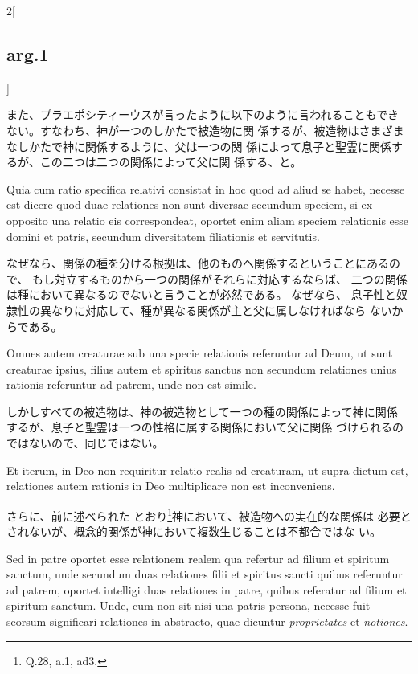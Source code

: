 \documentclass[paper=a4paper,fontsize=10pt,jafontsize=9pt,titlepage]{jlreq}
\begin{document}
\begin{paracol}{2}[\subsection{arg.1}]
\switchcolumn

また、プラエポシティーウスが言ったように以下のように言われることもでき
 ない。すなわち、神が一つのしかたで被造物に関
 係するが、被造物はさまざまなしかたで神に関係するように、父は一つの関
 係によって息子と聖霊に関係するが、この二つは二つの関係によって父に関
 係する、と。

\switchcolumn*

Quia cum ratio specifica relativi consistat in hoc quod ad
aliud se habet, necesse est dicere quod duae relationes non sunt
diversae secundum speciem, si ex opposito una relatio eis
correspondeat, oportet enim aliam speciem relationis esse domini et
patris, secundum diversitatem filiationis et servitutis.

\switchcolumn

なぜなら、関係の種を分ける根拠は、他のものへ関係するということにあるの
で、
もし対立するものから一つの関係がそれらに対応するならば、
二つの関係は種において異なるのでないと言うことが必然である。
なぜなら、
息子性と奴隷性の異なりに対応して、種が異なる関係が主と父に属しなければなら
ないからである。

\switchcolumn*

Omnes autem
creaturae sub una specie relationis referuntur ad Deum, ut sunt
creaturae ipsius, filius autem et spiritus sanctus non secundum
relationes unius rationis referuntur ad patrem, unde non est
simile.

\switchcolumn

しかしすべての被造物は、神の被造物として一つの種の関係によって神に関係
 するが、息子と聖霊は一つの性格に属する関係において父に関係
 づけられるのではないので、同じではない。

\switchcolumn*

Et iterum, in Deo non requiritur relatio realis ad creaturam,
ut supra dictum est, relationes autem rationis in Deo multiplicare non
est inconveniens.

\switchcolumn

さらに、前に述べられた
 とおり\footnote{Q.28, a.1, ad3.}神において、被造物への実在的な関係は
 必要とされないが、概念的関係が神において複数生じることは不都合ではな
 い。

\switchcolumn*

Sed in patre oportet esse relationem realem qua
refertur ad filium et spiritum sanctum, unde secundum duas relationes
filii et spiritus sancti quibus referuntur ad patrem, oportet
intelligi duas relationes in patre, quibus referatur ad filium et
spiritum sanctum. Unde, cum non sit nisi una patris persona, necesse
fuit seorsum significari relationes in abstracto, quae dicuntur
{\itshape proprietates} et {\itshape notiones}.


\end{paracol}
\end{document}
